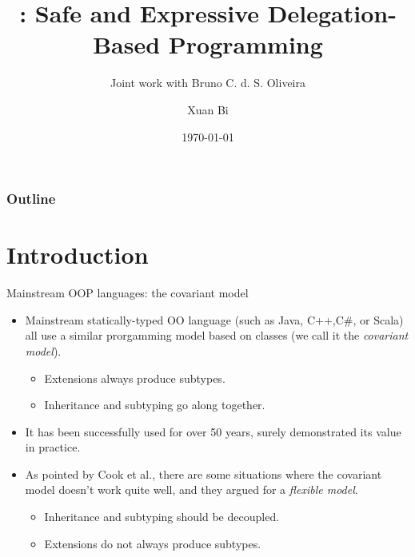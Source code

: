 \documentclass{beamer}
\title[\name]{\name: Safe and Expressive Delegation-Based Programming}
\subtitle{Joint work with Bruno C. d. S. Oliveira}
\date{\today}
\author{Xuan Bi}
\institute{The University of Hong Kong}
\begin{document}
\maketitle

\begin{frame}
  \frametitle{Outline}
  \tableofcontents
\end{frame}


\section{Introduction}

\begin{frame}{Mainstream OOP languages: the covariant model}

  \begin{itemize}
  \item<1-> Mainstream statically-typed OO language (such as Java, C++,C\#, or
    Scala) all use a similar prorgamming model based on classes (we call it
    the \textit{covariant model}).
    \begin{itemize}
    \item Extensions always produce subtypes.
    \item Inheritance and subtyping go along together.
    \end{itemize}

  \item<2-> It has been successfully used for over 50 years, surely demonstrated
    its value in practice.

  \item<3-> As pointed by Cook et al., there are some situations where the
    covariant model doesn't work quite well, and they argued for a
    \textit{flexible model}.
    \begin{itemize}
    \item Inheritance and subtyping should be decoupled.
    \item Extensions do not always produce subtypes.
    \end{itemize}


  \end{itemize}


\end{frame}
\end{document}
